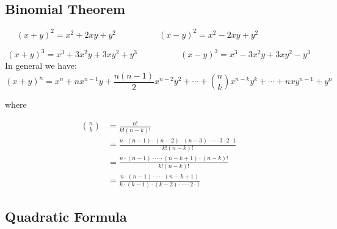 \subsection{Binomial Theorem}

\[
  (x + y)^2 = x^2 + 2xy + y^2 \hspace{5em}
  (x - y)^2 = x^2 - 2xy + y^2 \hspace{5em}
\]

\[
  (x + y)^3 = x^3 + 3x^2y + 3xy^2 + y^3 \hspace{5em}
  (x - y)^3 = x^3 - 3x^2y + 3xy^2 - y^3 
\]
In general we have:
\[
  (x + y)^n = x^n + nx^{n-1}y + \frac{n(n-1)}2 x^{n-2}y^2 + \cdots + \binom nk x^{n-k}y^k + \cdots + nxy^{n-1} + y^n
\]

where

\begin{align*}
  \binom nk &= \frac{n!}{k! (n - k)!} \\
            &= \frac{n \cdot (n-1) \cdot (n-2) \cdot (n-3) \cdot \cdots \cdot 3 \cdot 2 \cdot 1}{k!(n - k)!}\\
            &= \frac{n \cdot (n-1) \cdot \cdots \cdot (n - k + 1) \cdot (n-k)!}{k!(n - k)!}\\
            &= \frac{n \cdot (n-1) \cdot \cdots \cdot (n - k + 1)}{k \cdot (k-1) \cdot (k-2) \cdot \cdots \cdot 2 \cdot 1}
\end{align*}

\subsection{Quadratic Formula}
